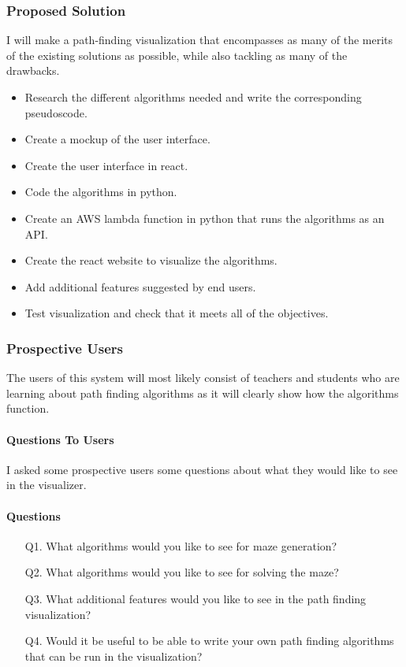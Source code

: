 \documentclass{article}
\begin{document}
\subsubsection{Proposed Solution}
I will make a path-finding visualization that encompasses as many of the merits of the existing solutions as possible, while also tackling as many of the drawbacks.
\begin{itemize}
    \item Research the different algorithms needed and write the corresponding pseudoscode.
    \item Create a mockup of the user interface.
    \item Create the user interface in react.
    \item Code the algorithms in python.
    \item Create an AWS lambda function in python that runs the algorithms as an API.
    \item Create the react website to visualize the algorithms.
    \item Add additional features suggested by end users.
    \item Test visualization and check that it meets all of the objectives.
\end{itemize}
\subsubsection{Prospective Users}
The users of this system will most likely consist of teachers and students who are learning about path finding algorithms as it will clearly show how the algorithms function.
\paragraph{Questions To Users}
I asked some prospective users some questions about what they would like to see in the visualizer.
\paragraph*{Questions}
\begin{enumerate}
    \item[Q1.]What algorithms would you like to see for maze generation?
    \item[Q2.]What algorithms would you like to see for solving the maze?
    \item[Q3.]What additional features would you like to see in the path finding visualization?
    \item[Q4.]Would it be useful to be able to write your own path finding algorithms that can be run in the visualization?  
\end{enumerate}
\end{document}
